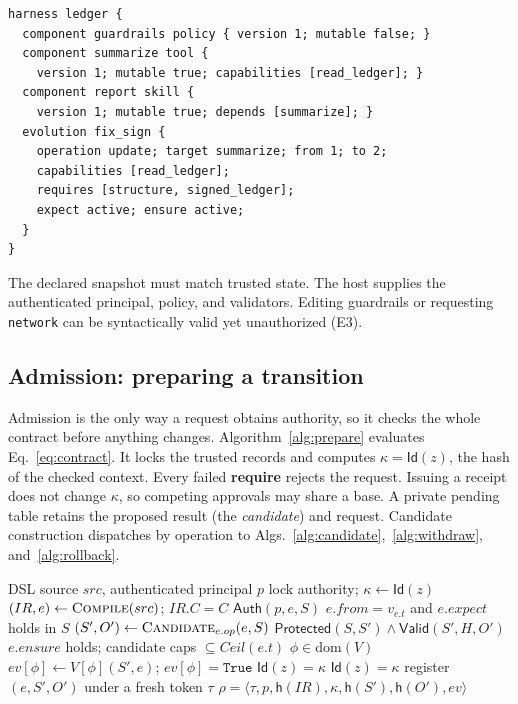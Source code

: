 \documentclass[letterpaper,journal]{IEEEtran}
\DeclareRobustCommand{\circled}[1]{\expandafter\usebox\csname flowbadge#1\endcsname}
\begin{document}
\begin{lstlisting}[float=t,caption={Running example, event E1: a \emph{request} to update \textsf{summarize}.},label={lst:dsl}]
harness ledger {
  component guardrails policy { version 1; mutable false; }
  component summarize tool {
    version 1; mutable true; capabilities [read_ledger]; }
  component report skill {
    version 1; mutable true; depends [summarize]; }
  evolution fix_sign {
    operation update; target summarize; from 1; to 2;
    capabilities [read_ledger];
    requires [structure, signed_ledger];
    expect active; ensure active;
  }
}
\end{lstlisting}

The declared snapshot must match trusted state. The host supplies the authenticated principal, policy, and validators. Editing \textsf{guardrails} or requesting \texttt{network} can be syntactically valid yet unauthorized (E3).

\subsection{Admission: preparing a transition}
Admission is the only way a request obtains authority, so it checks the whole contract before anything changes. Algorithm~\ref{alg:prepare} evaluates Eq.~\eqref{eq:contract}. It locks the trusted records and computes $\kappa=\mathsf{Id}(z)$, the hash of the checked context. Every failed \textbf{require} rejects the request. Issuing a receipt does not change $\kappa$, so competing approvals may share a base. A private pending table retains the proposed result (the \emph{candidate}) and request. Candidate construction dispatches by operation to Algs.~\ref{alg:candidate},~\ref{alg:withdraw}, and~\ref{alg:rollback}.

\begin{algorithm}[t]\caption{\textsc{Prepare}: admit a request (flows \circled{1} and \circled{2})}\label{alg:prepare}\footnotesize
\begin{algorithmic}[1]
\Require DSL source $src$, authenticated principal $p$
\State lock authority; $\kappa\gets\mathsf{Id}(z)$
\State $(IR,e)\gets\textsc{Compile}(src)$; \Req $IR.C=C$ 
\State \Req $\mathsf{Auth}(p,e,S)$ 
\State \Req $e.\mathit{from}=v_{e.t}$ and $e.\mathit{expect}$ holds in $S$
\State $(S',O')\gets\textsc{Candidate}_{e.op}(e,S)$
\State \Req $\mathsf{Protected}(S,S')\wedge\mathsf{Valid}(S',H,O')$
\State \Req $e.\mathit{ensure}$ holds; candidate caps $\subseteq\mathit{Ceil}(e.t)$
  \State \Req $\phi\in\mathrm{dom}(V)$
  \State $ev[\phi]\gets V[\phi](S',e)$; \Req $ev[\phi]=\texttt{True}$
  \State \Req $\mathsf{Id}(z)=\kappa$ 
\EndFor
\State \Req $\mathsf{Id}(z)=\kappa$
\State register $(e,S',O')$ under a fresh token $\tau$
\State \Return $\rho=\langle\tau,p,\mathsf{h}(\mathit{IR}),\kappa,\mathsf{h}(S'),\mathsf{h}(O'),ev\rangle$
\end{algorithmic}\end{algorithm}
\end{document}
